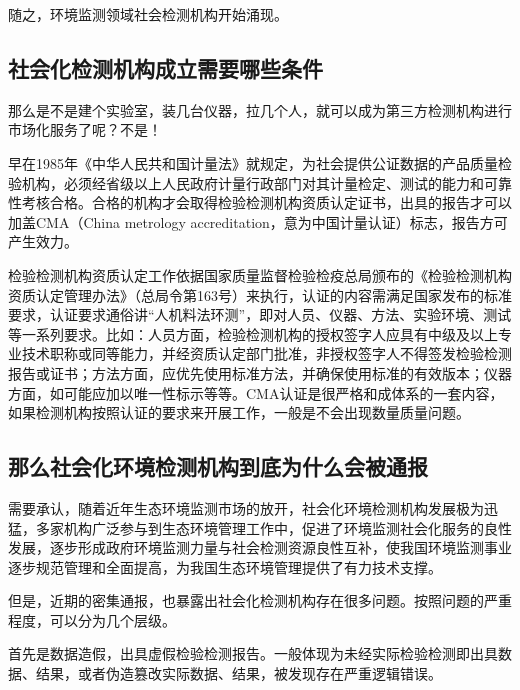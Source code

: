 \documentclass[
]{book}
\begin{document}
随之，环境监测领域社会检测机构开始涌现。

\hypertarget{ux793eux4f1aux5316ux68c0ux6d4bux673aux6784ux6210ux7acbux9700ux8981ux54eaux4e9bux6761ux4ef6}{%
\subsection{社会化检测机构成立需要哪些条件}\label{ux793eux4f1aux5316ux68c0ux6d4bux673aux6784ux6210ux7acbux9700ux8981ux54eaux4e9bux6761ux4ef6}}

那么是不是建个实验室，装几台仪器，拉几个人，就可以成为第三方检测机构进行市场化服务了呢？不是！

早在1985年《中华人民共和国计量法》就规定，为社会提供公证数据的产品质量检验机构，必须经省级以上人民政府计量行政部门对其计量检定、测试的能力和可靠性考核合格。合格的机构才会取得检验检测机构资质认定证书，出具的报告才可以加盖CMA（China metrology accreditation，意为中国计量认证）标志，报告方可产生效力。

检验检测机构资质认定工作依据国家质量监督检验检疫总局颁布的《检验检测机构资质认定管理办法》（总局令第163号）来执行，认证的内容需满足国家发布的标准要求，认证要求通俗讲``人机料法环测''，即对人员、仪器、方法、实验环境、测试等一系列要求。比如：人员方面，检验检测机构的授权签字人应具有中级及以上专业技术职称或同等能力，并经资质认定部门批准，非授权签字人不得签发检验检测报告或证书；方法方面，应优先使用标准方法，并确保使用标准的有效版本；仪器方面，如可能应加以唯一性标示等等。CMA认证是很严格和成体系的一套内容，如果检测机构按照认证的要求来开展工作，一般是不会出现数量质量问题。

\hypertarget{ux90a3ux4e48ux793eux4f1aux5316ux73afux5883ux68c0ux6d4bux673aux6784ux5230ux5e95ux4e3aux4ec0ux4e48ux4f1aux88abux901aux62a5}{%
\subsection{那么社会化环境检测机构到底为什么会被通报}\label{ux90a3ux4e48ux793eux4f1aux5316ux73afux5883ux68c0ux6d4bux673aux6784ux5230ux5e95ux4e3aux4ec0ux4e48ux4f1aux88abux901aux62a5}}

需要承认，随着近年生态环境监测市场的放开，社会化环境检测机构发展极为迅猛，多家机构广泛参与到生态环境管理工作中，促进了环境监测社会化服务的良性发展，逐步形成政府环境监测力量与社会检测资源良性互补，使我国环境监测事业逐步规范管理和全面提高，为我国生态环境管理提供了有力技术支撑。

但是，近期的密集通报，也暴露出社会化检测机构存在很多问题。按照问题的严重程度，可以分为几个层级。

首先是数据造假，出具虚假检验检测报告。一般体现为未经实际检验检测即出具数据、结果，或者伪造篡改实际数据、结果，被发现存在严重逻辑错误。
\end{document}
